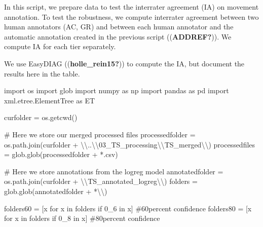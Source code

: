 \documentclass[
  letterpaper,
  DIV=11,
  numbers=noendperiod]{scrreprt}
\newenvironment{Shaded}{\begin{snugshade}}{\end{snugshade}}
\newcommand{\CharTok}[1]{\textcolor[rgb]{0.13,0.47,0.30}{#1}}
\newcommand{\CommentTok}[1]{\textcolor[rgb]{0.37,0.37,0.37}{#1}}
\newcommand{\ControlFlowTok}[1]{\textcolor[rgb]{0.00,0.23,0.31}{#1}}
\newcommand{\ImportTok}[1]{\textcolor[rgb]{0.00,0.46,0.62}{#1}}
\newcommand{\KeywordTok}[1]{\textcolor[rgb]{0.00,0.23,0.31}{#1}}
\newcommand{\NormalTok}[1]{\textcolor[rgb]{0.00,0.23,0.31}{#1}}
\newcommand{\OperatorTok}[1]{\textcolor[rgb]{0.37,0.37,0.37}{#1}}
\newcommand{\StringTok}[1]{\textcolor[rgb]{0.13,0.47,0.30}{#1}}
\begin{document}
In this script, we prepare data to test the interrater agreement (IA) on
movement annotation. To test the robustness, we compute interrater
agreement between two human annotators (AC, GR) and between each human
annotator and the automatic annotation created in the previous script
((\textbf{ADDREF?})). We compute IA for each tier separately.

We use EasyDIAG ((\textbf{holle\_rein15?})) to compute the IA, but
document the results here in the table.

\begin{Shaded}
\begin{Highlighting}[]
\ImportTok{import}\NormalTok{ os}
\ImportTok{import}\NormalTok{ glob}
\ImportTok{import}\NormalTok{ numpy }\ImportTok{as}\NormalTok{ np}
\ImportTok{import}\NormalTok{ pandas }\ImportTok{as}\NormalTok{ pd}
\ImportTok{import}\NormalTok{ xml.etree.ElementTree }\ImportTok{as}\NormalTok{ ET}

\NormalTok{curfolder }\OperatorTok{=}\NormalTok{ os.getcwd()}

\CommentTok{\# Here we store our merged processed files}
\NormalTok{processedfolder }\OperatorTok{=}\NormalTok{ os.path.join(curfolder }\OperatorTok{+} \StringTok{\textquotesingle{}}\CharTok{\textbackslash{}\textbackslash{}}\StringTok{..}\CharTok{\textbackslash{}\textbackslash{}}\StringTok{03\_TS\_processing}\CharTok{\textbackslash{}\textbackslash{}}\StringTok{TS\_merged}\CharTok{\textbackslash{}\textbackslash{}}\StringTok{\textquotesingle{}}\NormalTok{)}
\NormalTok{processedfiles }\OperatorTok{=}\NormalTok{ glob.glob(processedfolder }\OperatorTok{+} \StringTok{\textquotesingle{}*.csv\textquotesingle{}}\NormalTok{)}

\CommentTok{\# Here we store annotations from the logreg model}
\NormalTok{annotatedfolder }\OperatorTok{=}\NormalTok{ os.path.join(curfolder }\OperatorTok{+} \StringTok{\textquotesingle{}}\CharTok{\textbackslash{}\textbackslash{}}\StringTok{TS\_annotated\_logreg}\CharTok{\textbackslash{}\textbackslash{}}\StringTok{\textquotesingle{}}\NormalTok{)}
\NormalTok{folders }\OperatorTok{=}\NormalTok{ glob.glob(annotatedfolder }\OperatorTok{+} \StringTok{\textquotesingle{}*}\CharTok{\textbackslash{}\textbackslash{}}\StringTok{\textquotesingle{}}\NormalTok{)}

\NormalTok{folders60 }\OperatorTok{=}\NormalTok{ [x }\ControlFlowTok{for}\NormalTok{ x }\KeywordTok{in}\NormalTok{ folders }\ControlFlowTok{if} \StringTok{\textquotesingle{}0\_6\textquotesingle{}} \KeywordTok{in}\NormalTok{ x] }\CommentTok{\#60percent confidence}
\NormalTok{folders80 }\OperatorTok{=}\NormalTok{ [x }\ControlFlowTok{for}\NormalTok{ x }\KeywordTok{in}\NormalTok{ folders }\ControlFlowTok{if} \StringTok{\textquotesingle{}0\_8\textquotesingle{}} \KeywordTok{in}\NormalTok{ x] }\CommentTok{\#80percent confidence}


\end{Highlighting}
\end{Shaded}
\end{document}
